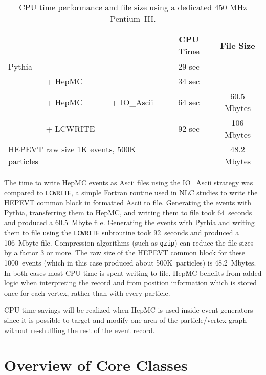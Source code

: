 \documentclass[11pt,letterpaper]{article}
\begin{document}
\begin{table}[h]
\begin{center}
\begin{tabular}{|l l l|c|c|} \hline
&&&CPU Time & File Size \\ \hline
Pythia &           &          & 29 sec & \\
       & + {\color{red}HepMC}   &          & 34 sec & \\ \hline
       & + {\color{red}HepMC} & + {\color{red}IO\_Ascii} 
       & 64 sec & 60.5 Mbytes \\
       & + {\color{green}LCWRITE} &          
       & 92 sec & 106 Mbytes \\
\multicolumn{3}{|l|}{HEPEVT raw size 1K events, 500K particles}
&& 48.2 Mbytes \\ \hline
\end{tabular}
\end{center}
\caption[Performance]{\label{benchmarks} 
  CPU time performance and file size using a dedicated 450 MHz Pentium~III.}
\end{table}

The time to write HepMC events as Ascii files using the IO\_Ascii
strategy was compared to \verb!LCWRITE!, a simple Fortran routine used
in NLC studies to write the HEPEVT common block in formatted Ascii to file.
Generating the events with Pythia, transferring them to HepMC, and
writing them to file took 64~seconds and produced a 60.5~Mbyte file.
Generating the events with Pythia and writing them to file using the
\verb!LCWRITE! subroutine took 92~seconds and produced a 106~Mbyte
file. Compression algorithms (such as \verb!gzip!) can reduce the file
sizes by a factor 3 or more.  The raw size of the HEPEVT common block
for these 1000~events (which in this case produced about 500K~particles) is
48.2~Mbytes.  In both cases most CPU time is spent writing to file.
HepMC benefits from added logic when interpreting the record and from 
position information which is stored once for each vertex, rather than
with every particle.  

CPU time savings will be realized when HepMC is
used inside event generators - since it is possible to target and
modify one area of the particle/vertex graph without re-shuffling the
rest of the event record.

%
%
\section{Overview of Core Classes}
\end{document}
